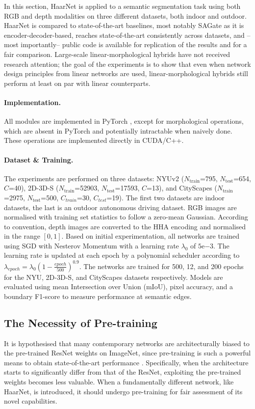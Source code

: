 \documentclass{article}
\newcommand{\myparagraph}[1]{\paragraph{\textbf{\textup{#1.}}}}
\begin{document}
In this section, HaarNet is applied to a semantic segmentation task using both RGB and depth modalities on three different datasets, both indoor and outdoor.
HaarNet is compared to state-of-the-art baselines, most notably SAGate \cite{chen2020bi} as it is encoder-decoder-based, reaches state-of-the-art consistently across datasets, and --most importantly-- public code is available for replication of the results and for a fair comparison.
Large-scale linear-morphological hybrids have not received research attention; the goal of the experiments is to show that even when network design principles from linear networks are used, linear-morphological hybrids still perform at least on par with linear counterparts.

\myparagraph{Implementation}
All modules are implemented in PyTorch \cite{paszke2019pytorch}, except for morphological operations, which are absent in PyTorch and potentially intractable when naively done. 
These operations are implemented directly in CUDA/C++.

\myparagraph{Dataset \& Training}
The experiments are performed on three datasets: NYUv2 ($N_{\text{train}}$=795, $N_{\text{test}}$=654, $C$=40), 2D-3D-S ($N_{\text{train}}$=52903, $N_{\text{test}}$=17593, $C$=13), and CityScapes ($N_{\text{train}}$=2975, $N_{\text{test}}$=500, $C_{train}$=30, $C_{test}$=19).
The first two datasets are indoor datasets, the last is an outdoor autonomous driving dataset.
RGB images are normalised with training set statistics to follow a zero-mean Gaussian.
According to convention, depth images are converted to the HHA encoding \cite{gupta2014learning} and normalised in the range $\left[0,1\right]$.
Based on initial experimentation, all networks are trained using SGD with Nesterov Momentum \cite{sutskever2013importance} with a learning rate $\lambda_{0}$ of $5\mathrm{e}{-3}$.
The learning rate is updated at each epoch by a polynomial scheduler according to $\lambda_{epoch} = \lambda_{0} \left(1 - \tfrac{epoch}{500}\right)^{0.9}$.
The networks are trained for 500, 12, and 200 epochs for the NYU, 2D-3D-S, and CityScapes datasets respectively.
Models are evaluated using mean Intersection over Union (mIoU), pixel accuracy, and a boundary F1-score \cite{csurka2004good} to measure performance at semantic edges.

\subsection{The Necessity of Pre-training} \label{sec:experiments:pre-training}
It is hypothesised that many contemporary networks are architecturally biased to the pre-trained ResNet weights on ImageNet, since pre-training is such a powerful means to obtain state-of-the-art performance \cite{yosinski2014transferable}.
Specifically, when the architecture starts to significantly differ from that of the ResNet, exploiting the pre-trained weights becomes less valuable.
When a fundamentally different network, like HaarNet, is introduced, it should undergo pre-training for fair assessment of its novel capabilities.
\end{document}
